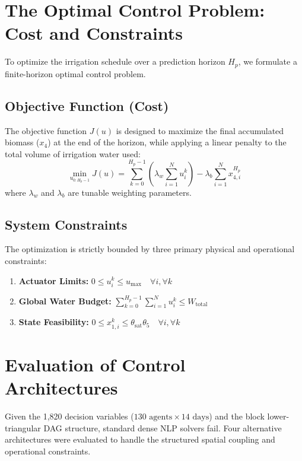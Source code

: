 \documentclass[11pt, a4paper]{article}
\begin{document}
\section{The Optimal Control Problem: Cost and Constraints}
\label{sec:ocp}
To optimize the irrigation schedule over a prediction horizon $H_p$, we formulate a finite-horizon optimal control problem.

\subsection{Objective Function (Cost)}
The objective function $J(u)$ is designed to maximize the final accumulated biomass ($x_4$) at the end of the horizon, while applying a linear penalty to the total volume of irrigation water used:
\begin{equation}
    \min_{u_{0:H_p-1}} J(u) = \sum_{k=0}^{H_p-1} \left( \lambda_w \sum_{i=1}^N u_i^k \right) - \lambda_b \sum_{i=1}^N x_{4, i}^{H_p}
\end{equation}
where $\lambda_w$ and $\lambda_b$ are tunable weighting parameters.

\subsection{System Constraints}
The optimization is strictly bounded by three primary physical and operational constraints:
\begin{enumerate}
    \item \textbf{Actuator Limits:} $0 \leq u_i^k \leq u_{\text{max}} \quad \forall i, \forall k$
    \item \textbf{Global Water Budget:} $\sum_{k=0}^{H_p-1} \sum_{i=1}^N u_i^k \leq W_{\text{total}}$
    \item \textbf{State Feasibility:} $0 \leq x_{1, i}^k \leq \theta_{\text{sat}} \theta_5 \quad \forall i, \forall k$
\end{enumerate}

\section{Evaluation of Control Architectures}
\label{sec:architectures}
Given the 1,820 decision variables ($130 \text{ agents} \times 14 \text{ days}$) and the block lower-triangular DAG structure, standard dense NLP solvers fail. Four alternative architectures were evaluated to handle the structured spatial coupling and operational constraints.
\end{document}
